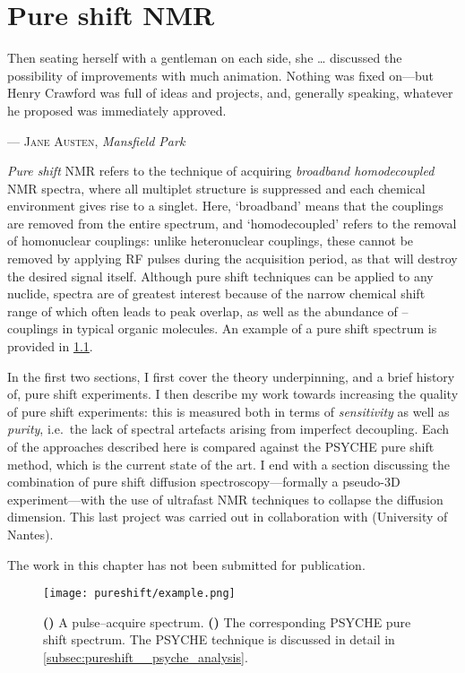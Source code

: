 \chapter{Pure shift NMR}
\label{chpt:pureshift}

\epigraph{\singlespacing%
Then seating herself with a gentleman on each side, she \ldots{} discussed the possibility of improvements with much animation. Nothing was fixed on---but Henry Crawford was full of ideas and projects, and, generally speaking, whatever he proposed was immediately approved.
}{--- \textsc{Jane Austen}, \textit{Mansfield Park}}

\textit{Pure shift} NMR refers to the technique of acquiring \textit{broadband homodecoupled} NMR spectra, where all multiplet structure is suppressed and each chemical environment gives rise to a singlet.\autocite{Zangger2015PNMRS,Castanar2017MRC}
Here, `broadband' means that the couplings are removed from the entire spectrum, and `homodecoupled' refers to the removal of homonuclear couplings: unlike heteronuclear couplings, these cannot be removed by applying RF pulses during the acquisition period, as that will destroy the desired signal itself.
Although pure shift techniques can be applied to any nuclide, \proton{} spectra are of greatest interest because of the narrow chemical shift range of \proton{} which often leads to peak overlap, as well as the abundance of \proton{}--\proton{} couplings in typical organic molecules.
An example of a pure shift spectrum is provided in \cref{fig:pureshift_example}.

In the first two sections, I first cover the theory underpinning, and a brief history of, pure shift experiments.
I then describe my work towards increasing the quality of pure shift experiments: this is measured both in terms of \textit{sensitivity} as well as \textit{purity}, i.e.\ the lack of spectral artefacts arising from imperfect decoupling.
Each of the approaches described here is compared against the PSYCHE pure shift method, which is the current state of the art.
I end with a section discussing the combination of pure shift diffusion spectroscopy---formally a pseudo-3D experiment---with the use of ultrafast NMR techniques to collapse the diffusion dimension.
This last project was carried out in collaboration with \JND{} (University of Nantes).

The work in this chapter has not been submitted for publication.

\begin{figure}[!ht]
    \centering
    \texttt{[image: pureshift/example.png]}%
    {\label{fig:pureshift_example_coupled}}%
    {\label{fig:pureshift_example_pureshift}}%
    \caption[Example of a pure shift spectrum]{
        \textbf{()} A pulse--acquire \proton{} spectrum.
        \textbf{()} The corresponding PSYCHE pure shift spectrum.
        The PSYCHE technique is discussed in detail in \cref{subsec:pureshift__psyche_analysis}.
    }
    \label{fig:pureshift_example}
\end{figure}

\clearpage










\printbibliography[heading=subbibnumbered]{}
